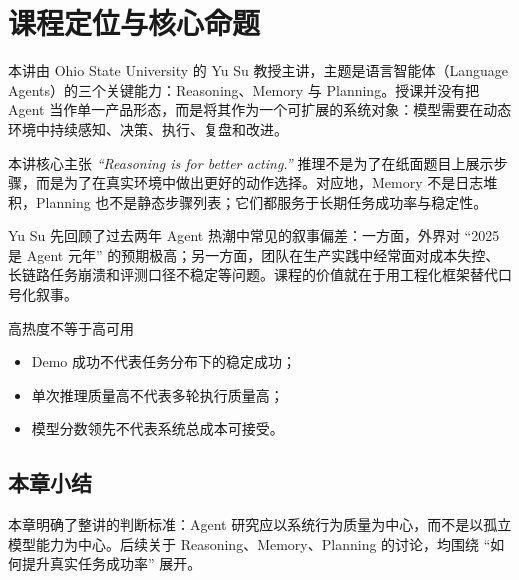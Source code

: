 \section{课程定位与核心命题}

本讲由 Ohio State University 的 Yu Su 教授主讲，主题是语言智能体（Language Agents）的三个关键能力：Reasoning、Memory 与 Planning。授课并没有把 Agent 当作单一产品形态，而是将其作为一个可扩展的系统对象：模型需要在动态环境中持续感知、决策、执行、复盘和改进。

\begin{importantbox}{本讲核心主张}
\textit{``Reasoning is for better acting.''} 推理不是为了在纸面题目上展示步骤，而是为了在真实环境中做出更好的动作选择。对应地，Memory 不是日志堆积，Planning 也不是静态步骤列表；它们都服务于长期任务成功率与稳定性。
\end{importantbox}

Yu Su 先回顾了过去两年 Agent 热潮中常见的叙事偏差：一方面，外界对 ``2025 是 Agent 元年'' 的预期极高；另一方面，团队在生产实践中经常面对成本失控、长链路任务崩溃和评测口径不稳定等问题。课程的价值就在于用工程化框架替代口号化叙事。

\begin{warningbox}{高热度不等于高可用}
\begin{itemize}
    \item Demo 成功不代表任务分布下的稳定成功；
    \item 单次推理质量高不代表多轮执行质量高；
    \item 模型分数领先不代表系统总成本可接受。
\end{itemize}
\end{warningbox}

\subsection{本章小结}
本章明确了整讲的判断标准：Agent 研究应以系统行为质量为中心，而不是以孤立模型能力为中心。后续关于 Reasoning、Memory、Planning 的讨论，均围绕 ``如何提升真实任务成功率'' 展开。

